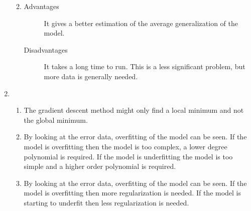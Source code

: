 \begin{enumerate}
\begin{enumerate}
\begin{minipage}[t]{0.9\textwidth}
\begin{tikzpicture}[baseline=(current bounding box.north)]
            \end{tikzpicture}
          \end{minipage}
        \item
          \begin{description}
              \item[Advantages] It gives a better estimation of the average generalization of the model.
              \item[Disadvantages] It takes a long time to run.
                                   This is a less significant problem, but more data is generally needed.
          \end{description}
      \end{enumerate}
    \item
      \begin{enumerate}
          \item
            The gradient descent method might only find a local minimum and not the global minimum.
          \item
            By looking at the error data, overfitting of the model can be seen.
            If the model is overfitting then the model is too complex, a lower degree polynomial is required.
            If the model is underfitting the model is too simple and a higher order polynomial is required.

          \item
            By looking at the error data, overfitting of the model can be seen.
            If the model is overfitting then more regularization is needed.
            If the model is starting to underfit then less regularization is needed.
      \end{enumerate}
\end{enumerate}
